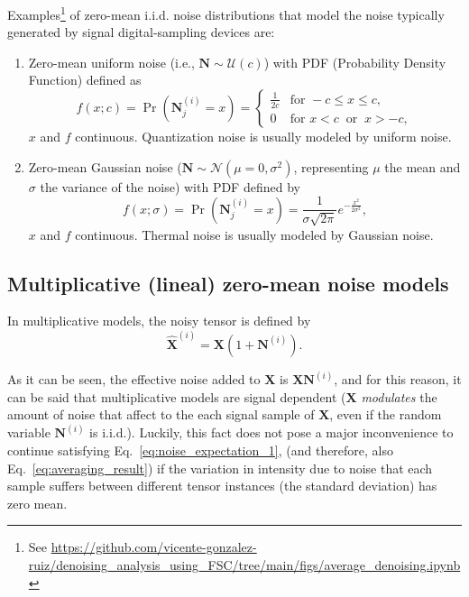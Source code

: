 \documentclass{article}
\begin{document}
Examples\footnote{See
  \url{https://github.com/vicente-gonzalez-ruiz/denoising_analysis_using_FSC/tree/main/figs/average_denoising.ipynb}}
of zero-mean i.i.d. noise distributions that model the noise typically
generated by signal digital-sampling devices are:
\begin{enumerate}
\item Zero-mean uniform noise (i.e., ${\mathbf N}\sim{\mathcal U}(c)$) with
  PDF (Probability Density Function) defined as
  \begin{equation}
    f(x; c) = \Pr({\mathbf N}^{(i)}_j{=}x) = \begin{cases}
      \frac{1}{2c} & \text{for } -c \le x \le c, \\[8pt]
      0 & \text{for } x < c \ \text{ or } \ x > -c,
    \end{cases}
  \end{equation}
  $x$ and $f$ continuous. Quantization noise is usually modeled by
  uniform noise.
\item Zero-mean Gaussian noise
  (${\mathbf N}\sim{\mathcal N}(\mu=0,\sigma^2)$, representing $\mu$
  the mean and $\sigma$ the variance of the noise) with PDF defined by
  \begin{equation}
    f(x; \sigma) = \Pr({\mathbf N}^{(i)}_j{=}x) = \frac 1 {\sigma\sqrt{2\pi}} e^{-\frac{x^2}{2\sigma^2} },
  \end{equation}
  $x$ and $f$ continuous. Thermal noise is usually modeled by Gaussian
  noise.
\end{enumerate}

\subsection{Multiplicative (lineal) zero-mean noise models}
In multiplicative models, the noisy tensor is defined by
\begin{equation}
  \hat{\mathbf X}^{(i)} = {\mathbf X} (1 + {\mathbf N}^{(i)}).
  \label{eq:multiplicative_noisy_model}
\end{equation}

As it can be seen, the effective noise added to ${\mathbf X}$ is
${\mathbf X}{\mathbf N}^{(i)}$, and for this reason, it can be said
that multiplicative models are signal dependent (${\mathbf X}$
\emph{modulates} the amount of noise that affect to the each signal
sample of ${\mathbf X}$, even if the random variable
${\mathbf N}^{(i)}$ is i.i.d.). Luckily, this fact does not pose a
major inconvenience to continue satisfying
Eq.~\ref{eq:noise_expectation_1}, (and therefore, also
Eq.~\ref{eq:averaging_result}) if the variation in intensity due to
noise that each sample suffers between different tensor instances (the
standard deviation) has zero mean.
\end{document}
